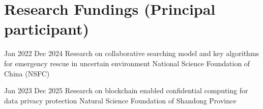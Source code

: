 \ifswedish

\else
    \section{Research Fundings (Principal participant)}

        \funding
        {Jan 2022 \textemdash{} Dec 2024}
        {Research on collaborative searching model and key algorithms for emergency rescue in uncertain environment}
        {National Science Foundation of China (NSFC)}
        
        \funding
        {Jan 2023 \textemdash{} Dec 2025}
        {Research on blockchain enabled confidential computing for data privacy protection}
        {Natural Science Foundation of Shandong Province}
\fi

